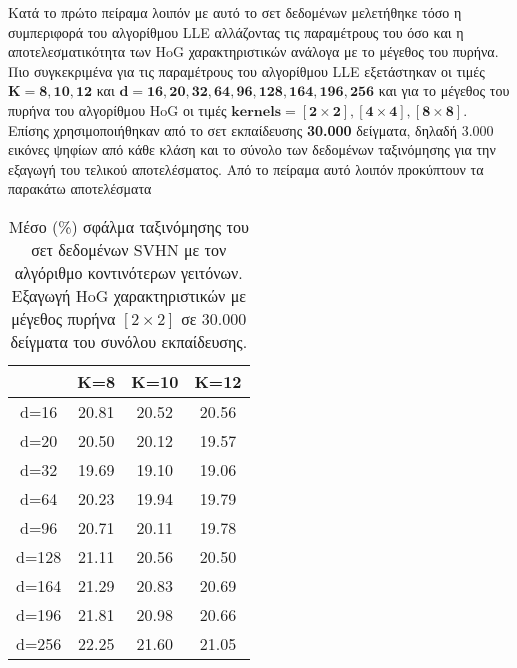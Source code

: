 \par
Κατά το πρώτο πείραμα λοιπόν με αυτό το σετ δεδομένων μελετήθηκε τόσο η συμπεριφορά του αλγορίθμου \textlatin{LLE} αλλάζοντας τις παραμέτρους του όσο και η αποτελεσματικότητα των \textlatin{HoG}\textlatin{\cite{hog}} χαρακτηριστικών ανάλογα με το μέγεθος του πυρήνα. Πιο συγκεκριμένα για τις παραμέτρους του αλγορίθμου \textlatin{LLE} εξετάστηκαν οι τιμές $\mathbf{Κ=8,10,12}$ και $\mathbf{d=16,20,32,64,96,128,164,196,256}$ και για το μέγεθος του πυρήνα του αλγορίθμου \textlatin{HoG}\textlatin{\cite{hog}} οι τιμές $\mathbf{kernels=[2\times2],[4\times4],[8\times8]}$. Επίσης χρησιμοποιήθηκαν από το σετ εκπαίδευσης \textbf{30.000} δείγματα, δηλαδή 3.000 εικόνες ψηφίων από κάθε κλάση και το σύνολο των δεδομένων ταξινόμησης για την εξαγωγή του τελικού αποτελέσματος. Από το πείραμα αυτό λοιπόν προκύπτουν τα παρακάτω αποτελέσματα

\begin{table}[H]
\singlespacing
\centering
\label{tab:table11}
\caption{Μέσο (\%) σφάλμα ταξινόμησης του σετ δεδομένων \textlatin{SVHN} με τον αλγόριθμο κοντινότερων γειτόνων. Εξαγωγή \textlatin{HoG} χαρακτηριστικών με μέγεθος πυρήνα $[2\times2]$ σε 30.000 δείγματα του συνόλου εκπαίδευσης. }
\vspace*{5mm}
\begin{tabular}{|c|c|c|c|}
\hline
 & K=8 & K=10 & K=12 \\
\hline
d=16 & 20.81 & 20.52 & 20.56 \\
d=20 & 20.50 & 20.12 & 19.57 \\
d=32 & 19.69 & 19.10 & 19.06 \\
d=64 & 20.23 & 19.94 & 19.79 \\
d=96 & 20.71 & 20.11 & 19.78 \\
d=128 & 21.11 & 20.56 & 20.50 \\
d=164 & 21.29 & 20.83 & 20.69 \\
d=196 & 21.81 & 20.98 & 20.66 \\
d=256 & 22.25 & 21.60 & 21.05 \\
\hline
\end{tabular}
\end{table}

